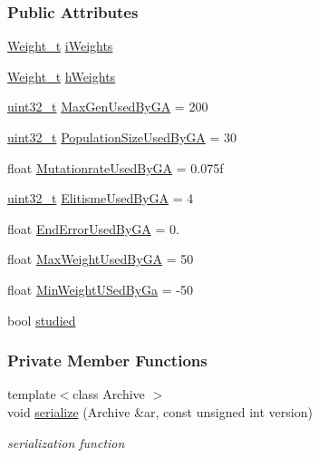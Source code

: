 \subsubsection*{Public Attributes}
\begin{DoxyCompactItemize}
\item 
\hyperlink{_soil_math_types_8h_ac56ad2b88186620fd0de0d213aa715dd}{Weight\+\_\+t} \hyperlink{class_soil_math_1_1_n_n_a96b0fe3caeed3d285204a6b4506075c9}{i\+Weights}
\item 
\hyperlink{_soil_math_types_8h_ac56ad2b88186620fd0de0d213aa715dd}{Weight\+\_\+t} \hyperlink{class_soil_math_1_1_n_n_a46db1b2814215509a7345fccc8928efe}{h\+Weights}
\item 
\hyperlink{_soil_math_types_8h_a435d1572bf3f880d55459d9805097f62}{uint32\+\_\+t} \hyperlink{class_soil_math_1_1_n_n_a360b26e66639b4eed186a62cdbac37e0}{Max\+Gen\+Used\+By\+G\+A} = 200
\item 
\hyperlink{_soil_math_types_8h_a435d1572bf3f880d55459d9805097f62}{uint32\+\_\+t} \hyperlink{class_soil_math_1_1_n_n_ac6acaf7e9572edbee9c0179ccd584b6f}{Population\+Size\+Used\+By\+G\+A} = 30
\item 
float \hyperlink{class_soil_math_1_1_n_n_a4969171a8362796a1633b1ac1f11ba74}{Mutationrate\+Used\+By\+G\+A} = 0.\+075f
\item 
\hyperlink{_soil_math_types_8h_a435d1572bf3f880d55459d9805097f62}{uint32\+\_\+t} \hyperlink{class_soil_math_1_1_n_n_aee7f8d1feb35f3230c10894dacf69740}{Elitisme\+Used\+By\+G\+A} = 4
\item 
float \hyperlink{class_soil_math_1_1_n_n_aa29b48e0711848633d5cdbb22055910d}{End\+Error\+Used\+By\+G\+A} = 0.
\item 
float \hyperlink{class_soil_math_1_1_n_n_a2e6360ebc99e10072eb378f9d7f2e915}{Max\+Weight\+Used\+By\+G\+A} = 50
\item 
float \hyperlink{class_soil_math_1_1_n_n_a653c42b4f2fe2f685d5f4e922e0126b2}{Min\+Weight\+U\+Sed\+By\+Ga} = -\/50
\item 
bool \hyperlink{class_soil_math_1_1_n_n_aed36297c9221a837fee94f4774b614bf}{studied}
\end{DoxyCompactItemize}
\subsubsection*{Private Member Functions}
\begin{DoxyCompactItemize}
\item 
{\footnotesize template$<$class Archive $>$ }\\void \hyperlink{class_soil_math_1_1_n_n_a110f1834e96d352572fcf5124e1a26b0}{serialize} (Archive \&ar, const unsigned int version)
\begin{DoxyCompactList}\small\item\em serialization function \end{DoxyCompactList}\end{DoxyCompactItemize}
